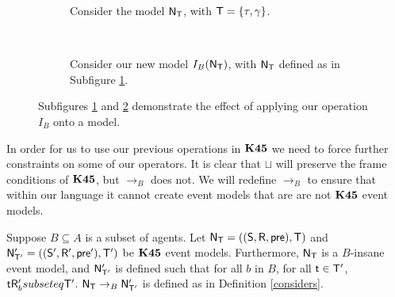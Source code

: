 \begin{figure}[ht!]
\centering
\begin{subfigure}[b]{.45\textwidth}
\centering
{}
\caption{Consider the model $\mathrm{\mathsf{N}}_\mathrm{\mathsf{T}}$, with $\mathrm{\mathsf{T}} = \{\tau, \gamma\}$.}
\label{beforeOperation}
\end{subfigure}
~
\begin{subfigure}[b]{.45\textwidth}
\centering
{}
\caption{Consider our new model $I_B(\mathrm{\mathsf{N}}_\mathrm{\mathsf{T}})$, with $\mathrm{\mathsf{N}}_\mathrm{\mathsf{T}}$ defined as in Subfigure
\ref{beforeOperation}.}
\label{afterOperation}
\end{subfigure}
\caption{Subfigures \ref{beforeOperation} and \ref{afterOperation} demonstrate the effect of
applying our operation $I_B$ onto a model.}
\label{k45VsKModels}
\end{figure}

In order for us to use our previous operations in $\bf K45$ we need to force further constraints on
some of our operators.
It is clear that $\sqcup$ will preserve the frame conditions of $\bf K45$, but $\to_B$ does not.
We will redefine $\to_B$ to ensure that within our language it cannot create event models that are
are not $\bf K45$ event models.

\begin{defn} \label{defn:k45:considers}
	Suppose $B \subseteq A$ is a subset of agents.
	Let $\mathrm{\mathsf{N}}_\mathrm{\mathsf{T}} = ((\mathrm{\mathsf{S}},\mathrm{\mathsf{R}},\mathrm{\mathsf{pre}}),\mathrm{\mathsf{T}})$ and $\mathrm{\mathsf{N}}'_{\mathrm{\mathsf{T}}'} = ((\mathrm{\mathsf{S}}',\mathrm{\mathsf{R}}',\mathrm{\mathsf{pre}}'),\mathrm{\mathsf{T}}')$ be $\bf K45$ event models.
	Furthermore, $\mathrm{\mathsf{N}}_\mathrm{\mathsf{T}}$ is a $B$-insane event model, and $\mathrm{\mathsf{N}}'_{\mathrm{\mathsf{T}}'}$ is defined such that for
	all $b$ in $B$, for all $\mathrm{\mathsf{t}} \in \mathrm{\mathsf{T}}'$, $\mathrm{\mathsf{t}} \mathrm{\mathsf{R}}'_b subseteq \mathrm{\mathsf{T}}'$.
	$\mathrm{\mathsf{N}}_\mathrm{\mathsf{T}} \to_B \mathrm{\mathsf{N}}'_{\mathrm{\mathsf{T}}'}$ is defined as in Definition \ref{considers}.
\end{defn}


